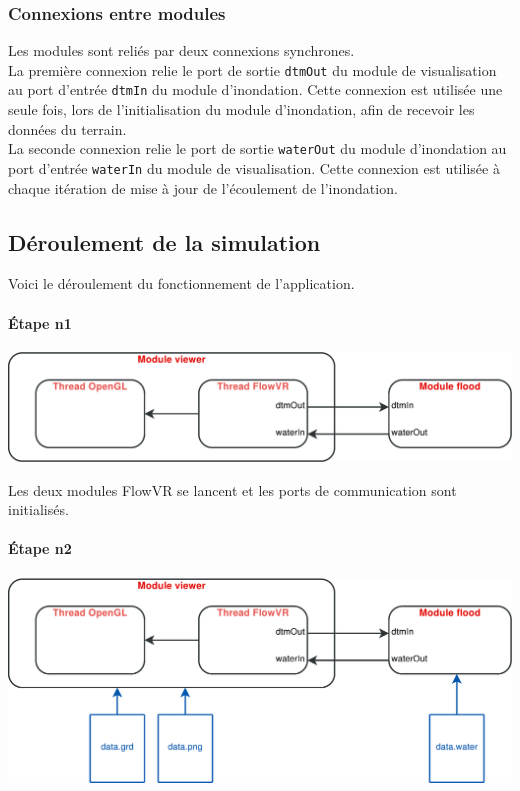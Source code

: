 \documentclass[a4paper, 12pt]{article}
\begin{document}
\subsubsection{Connexions entre modules}

Les modules sont reliés par deux connexions synchrones. \\

La première connexion relie le port de sortie \texttt{dtmOut} du module de
visualisation au port d'entrée \texttt{dtmIn} du module d'inondation. Cette
connexion est utilisée une seule fois, lors de l'initialisation du module
d'inondation, afin de recevoir les données du terrain. \\

La seconde connexion relie le port de sortie \texttt{waterOut} du module
d'inondation au port d'entrée \texttt{waterIn} du module de visualisation.
Cette connexion est utilisée à chaque itération de mise à jour de l'écoulement
de l'inondation.

\pagebreak

\subsection{Déroulement de la simulation}

Voici le déroulement du fonctionnement de l'application.

\paragraph*{Étape n1}

\begin{center}
\includegraphics[scale=0.4]{include/schemas/1.pdf}
\end{center}

Les deux modules FlowVR se lancent et les ports de communication sont
initialisés.

\paragraph*{Étape n2}

\begin{center}
\includegraphics[scale=0.4]{include/schemas/2.pdf}
\end{center}
\end{document}

